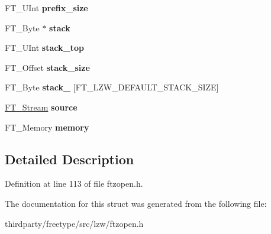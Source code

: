 \begin{DoxyCompactItemize}
F\+T\+\_\+\+U\+Int {\bfseries prefix\+\_\+size}
\item 
\mbox{\label{struct_f_t___lzw_state_rec___a92f8335f0d3e2c5597f6073fe424f7b0}} 
F\+T\+\_\+\+Byte $\ast$ {\bfseries stack}
\item 
\mbox{\label{struct_f_t___lzw_state_rec___ab4af1149c63c4fa9b8d6933de7ab9939}} 
F\+T\+\_\+\+U\+Int {\bfseries stack\+\_\+top}
\item 
\mbox{\label{struct_f_t___lzw_state_rec___ac29da78e15ef67a74db3cd4dd2d7966e}} 
F\+T\+\_\+\+Offset {\bfseries stack\+\_\+size}
\item 
\mbox{\label{struct_f_t___lzw_state_rec___a93386e93f830ebf6af882766d1e10f51}} 
F\+T\+\_\+\+Byte {\bfseries stack\+\_} \mbox{[}F\+T\+\_\+\+L\+Z\+W\+\_\+\+D\+E\+F\+A\+U\+L\+T\+\_\+\+S\+T\+A\+C\+K\+\_\+\+S\+I\+ZE\mbox{]}
\item 
\mbox{\label{struct_f_t___lzw_state_rec___a2d53aa0995ba61d5da515be01ed9971f}} 
\hyperlink{struct_f_t___stream_rec__}{F\+T\+\_\+\+Stream} {\bfseries source}
\item 
\mbox{\label{struct_f_t___lzw_state_rec___a17127536cf5cc510053e6feaac407f13}} 
F\+T\+\_\+\+Memory {\bfseries memory}
\end{DoxyCompactItemize}


\subsection{Detailed Description}


Definition at line 113 of file ftzopen.\+h.



The documentation for this struct was generated from the following file\+:\begin{DoxyCompactItemize}
\item 
thirdparty/freetype/src/lzw/ftzopen.\+h\end{DoxyCompactItemize}
